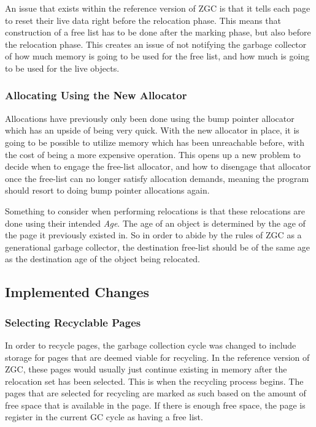 An issue that exists within the reference version of ZGC is that it tells each page to reset their live data right before the relocation phase. This means that construction of a free list has to be done after the marking phase, but also before the relocation phase. This creates an issue of not notifying the garbage collector of how much memory is going to be used for the free list, and how much is going to be used for the live objects.

\subsubsection{Allocating Using the New Allocator}
Allocations have previously only been done using the bump pointer allocator which has an upside of being very quick. With the new allocator in place, it is going to be possible to utilize memory which has been unreachable before, with the cost of being a more expensive operation. This opens up a new problem to decide when to engage the free-list allocator, and how to disengage that allocator once the free-list can no longer satisfy allocation demands, meaning the program should resort to doing bump pointer allocations again.

Something to consider when performing relocations is that these relocations are done using their intended \textit{Age}. The age of an object is determined by the age of the page it previously existed in. So in order to abide by the rules of ZGC as a generational garbage collector, the destination free-list should be of the same age as the destination age of the object being relocated.

\subsection{Implemented Changes}
\subsubsection{Selecting Recyclable Pages}
In order to recycle pages, the garbage collection cycle was changed to include storage for pages that are deemed viable for recycling. In the reference version of ZGC, these pages would usually just continue existing in memory after the relocation set has been selected. This is when the recycling process begins. The pages that are selected for recycling are marked as such based on the amount of free space that is available in the page. If there is enough free space, the page is register in the current GC cycle as having a free list. 

